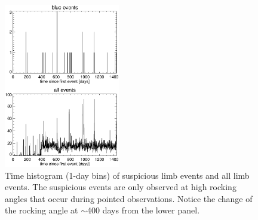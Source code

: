 \documentclass[aps,twocolumn,prd,superscriptaddress,showpacs,nofootinbib,fixfloat]{revtex4}
\begin{document}
\begin{figure}
  \centering
  \includegraphics[width=0.45\textwidth]{plots/timehist.ps}
  \caption{Time histogram (1-day bins) of suspicious limb
  events and all limb events.  The suspicious events are
  only observed at high rocking angles that occur during
  pointed observations. Notice the change of the rocking
  angle at $\sim$400 days from the lower panel.}
  \label{fig:timehist}
\end{figure}

\end{document}
